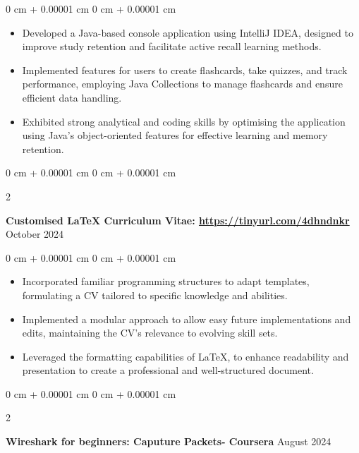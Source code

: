 \documentclass[10pt, letterpaper]{article}
\newenvironment{highlights}{
    \begin{itemize}[
        topsep=0.10 cm,
        parsep=0.10 cm,
        partopsep=0pt,
        itemsep=0pt,
        leftmargin=0 cm + 10pt
    ]
}{
    \end{itemize}
} %
\newenvironment{onecolentry}{
    \begin{adjustwidth}{
        0 cm + 0.00001 cm
    }{
        0 cm + 0.00001 cm
    }
}{
    \end{adjustwidth}
} %
\newenvironment{twocolentry}[2][]{
    \onecolentry
    \def\secondColumn{#2}
    \setcolumnwidth{\fill, 4.5 cm}
    \begin{paracol}{2}
}{
    \switchcolumn \raggedleft \secondColumn
    \end{paracol}
    \endonecolentry
} %
\begin{document}
        \vspace{0.05 cm}
        \begin{onecolentry}
            \begin{highlights}
                \item Developed a Java-based console application using IntelliJ IDEA, designed to improve study retention and facilitate active recall learning methods.
                \item Implemented features for users to create flashcards, take quizzes, and track performance, employing Java Collections to manage flashcards and ensure efficient data handling.
                \item Exhibited strong analytical and coding skills by optimising the application using Java's object-oriented features for effective learning and memory retention.
            \end{highlights}
        \end{onecolentry}


        \vspace{0.2 cm}
    \begin{twocolentry}{ October 2024
        }
            \textbf{Customised LaTeX Curriculum Vitae: \href{https://github.com/rw200219/LaTeX-CV}{https://tinyurl.com/4dhndnkr}}\end{twocolentry}

        \vspace{0.05 cm}
        \begin{onecolentry}
            \begin{highlights}
                \item Incorporated familiar programming structures to adapt templates, formulating a CV tailored to specific knowledge and abilities.
            \item Implemented a modular approach to allow easy future implementations and edits, maintaining the CV's relevance to evolving skill sets. 
                \item Leveraged the formatting capabilities of LaTeX, to enhance readability and presentation to create a professional and well-structured document.
            \end{highlights}
        \end{onecolentry}


        \vspace{0.2 cm}
       
        

        \begin{twocolentry}{
            August 2024
        }
            \textbf{Wireshark for beginners: Caputure Packets- Coursera}\end{twocolentry}
\end{document}
